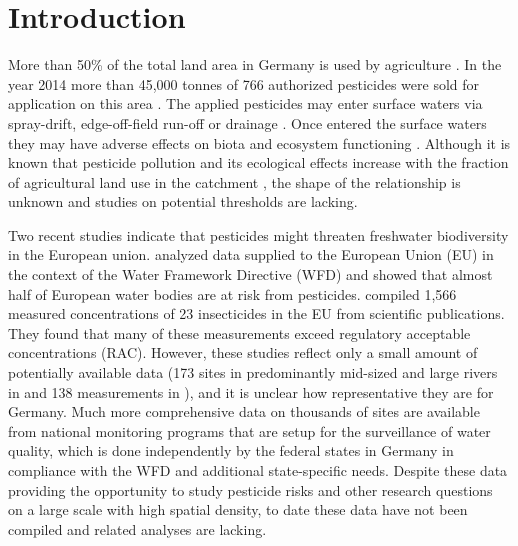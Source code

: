 \documentclass[journal=esthag,manuscript=article]{achemso}
\begin{document}


\section{Introduction}
More than 50\% of the total land area in Germany is used by agriculture \citep{statistisches_bundesamt_bodenflache_2014}.
In the year 2014 more than 45,000 tonnes of 766 authorized pesticides were sold for application on this area \citep{bundesamt_fur_verbraucherschutz_und_lebensmittelsicherheit_absatz_2015}.
The applied pesticides may enter surface waters via spray-drift, edge-off-field run-off or drainage \citep{stehle_probabilistic_2013,schulz_comparison_2001,liess_determination_1999}.
Once entered the surface waters they may have adverse effects on biota and ecosystem functioning \citep{schafer_thresholds_2012}. 
Although it is known that pesticide pollution and its ecological effects increase with the fraction of agricultural land use in the catchment \citep{schulz_field_2004}, the shape of the relationship is unknown and studies on potential thresholds are lacking.

Two recent studies indicate that pesticides might threaten freshwater biodiversity in the European union.
\citet{malaj_organic_2014} analyzed data supplied to the European Union (EU) in the context of the Water Framework Directive (WFD) and showed that almost half of European water bodies are at risk from pesticides.
\citet{stehle_pesticide_2015} compiled 1,566 measured concentrations of 23 insecticides in the EU from scientific publications. 
They found that many of these measurements exceed regulatory acceptable concentrations (RAC).
However, these studies reflect only a small amount of potentially available data (173 sites in predominantly mid-sized and large rivers in \citet{malaj_organic_2014} and 138 measurements in \citet{stehle_pesticide_2015}), and it is unclear how representative they are for Germany. %
Much more comprehensive data on thousands of sites are available from national monitoring programs that are setup for the surveillance of water quality,
which is done independently by the federal states in Germany in compliance with the WFD \citep{quevauviller_water_2008} and additional state-specific needs. 
Despite these data providing the opportunity to study pesticide risks and other research questions on a large scale with high spatial density, to date these data have not been compiled and related analyses are lacking. 
\end{document}
